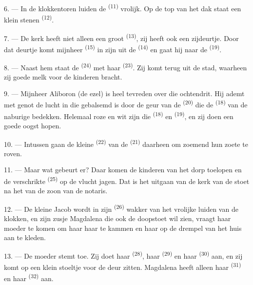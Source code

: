 6. --- In de klokkentoren luiden de  \textsuperscript{(11)} vrolijk. Op de top
van het dak staat een klein stenen  \textsuperscript{(12)}.

7. --- De kerk heeft niet alleen een groot  \textsuperscript{(13)}, zij heeft
ook een zijdeurtje. Door dat deurtje komt mijnheer  \textsuperscript{(15)} in
zijn  uit de
 \textsuperscript{(14)} en gaat hij naar de
 \textsuperscript{(19)}.

8. --- Naast hem staat de  \textsuperscript{(24)} met haar
 \textsuperscript{(23)}. Zij komt terug uit de stad, waarheen zij
goede melk voor de kinderen bracht.

\VUsaut{4.0mm}
\VUsaut{3.4mm}

9. --- Mijnheer Aliboron (de ezel) is heel tevreden over die ochtendrit. Hij ademt met genot
de lucht in die gebalsemd is door de geur van de
 \textsuperscript{(20)} die de 
\textsuperscript{(18)} van de naburige  bedekken. Helemaal roze en wit zijn
die  \textsuperscript{(18)} en
 \textsuperscript{(19)}, en zij doen een goede oogst
hopen.

10. --- Intussen gaan de kleine  \textsuperscript{(22)} van de
 \textsuperscript{(21)} daarheen om zoemend hun zoete
 te roven.

11. --- Maar wat gebeurt er? Daar komen de kinderen van het dorp toelopen en de verschrikte
 \textsuperscript{(25)} op de vlucht jagen. Dat is het uitgaan van de kerk van
de stoet na het  van de zoon van de notaris.

12. --- De kleine Jacob wordt in zijn  \textsuperscript{(26)} wakker van het
vrolijke luiden van de klokken, en zijn zusje Magdalena die ook de doopstoet wil zien, vraagt
haar moeder te komen om haar haar te kammen en haar op de drempel van het huis aan te kleden.

13. --- De moeder stemt toe. Zij doet haar  \textsuperscript{(28)}, haar
 \textsuperscript{(29)} en haar
 \textsuperscript{(30)} aan, en zij komt op een klein stoeltje
voor de deur zitten. Magdalena heeft alleen haar  \textsuperscript{(31)} en
haar  \textsuperscript{(32)} aan.

